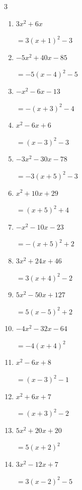 \begin{multicols}{3}
\begin{enumerate}
        $=\left( x-4\right)^{2}+4$

  \item $3x^{2}+6x$

        $=3\left( x+1\right)^{2}-3$

  \item $-5x^{2}+40x-85$

        $=-5\left( x-4\right)^{2}-5$

  \item $-x^{2}-6x-13$

        $=-\left( x+3\right)^{2}-4$

  \item $x^{2}-6x+6$

        $=\left( x-3\right)^{2}-3$

  \item $-3x^{2}-30x-78$

        $=-3\left( x+5\right)^{2}-3$

  \item $x^{2}+10x+29$

        $=\left( x+5\right)^{2}+4$

\columnbreak %

  \item $-x^{2}-10x-23$

        $=-\left( x+5\right)^{2}+2$

  \item $3x^{2}+24x+46$

        $=3\left( x+4\right)^{2}-2$

  \item $5x^{2}-50x+127$

        $=5\left( x-5\right)^{2}+2$

  \item $-4x^{2}-32x-64$

        $=-4\left( x+4\right)^{2}$

  \item $x^{2}-6x+8$

        $=\left( x-3\right)^{2}-1$

  \item $x^{2}+6x+7$

        $=\left( x+3\right)^{2}-2$

  \item $5x^{2}+20x+20$

        $=5\left( x+2\right)^{2}$

  \item $3x^{2}-12x+7$

        $=3\left( x-2\right)^{2}-5$


\end{enumerate}
\end{multicols}
